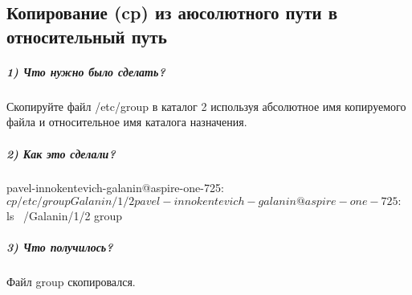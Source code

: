 \subsection{Копирование (cp) из аюсолютного пути в относительный путь}

\subparagraph{1) Что нужно было сделать?}

Скопируйте файл /etc/group в каталог 2 используя абсолютное имя копируемого файла и относительное имя каталога назначения.

\subparagraph{2) Как это сделали?}

\begin{MyVerbatimCode}[label=Debian terminal]
pavel-innokentevich-galanin@aspire-one-725:~$ cp /etc/group Galanin/1/2
pavel-innokentevich-galanin@aspire-one-725:~$ ls ~/Galanin/1/2
group
\end{MyVerbatimCode}

\subparagraph{3) Что получилось?}

Файл group скопировался.
